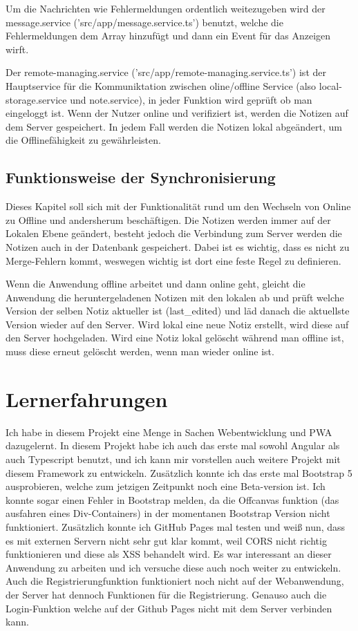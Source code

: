 \documentclass[12pt]{article}
\begin{document}
Um die Nachrichten wie Fehlermeldungen ordentlich weitezugeben wird der message.service ('src/app/message.service.ts') benutzt, welche die Fehlermeldungen dem Array hinzufügt und dann ein Event für das Anzeigen wirft.

Der remote-managing.service ('src/app/remote-managing.service.ts') ist der Hauptservice für die Kommuniktation zwischen oline/offline Service (also local-storage.service und note.service), in jeder Funktion wird geprüft ob man eingeloggt ist. Wenn der Nutzer online und verifiziert ist, werden die Notizen auf dem Server gespeichert. In jedem Fall werden die Notizen lokal abgeändert, um die Offlinefähigkeit zu gewährleisten. 

        \subsection{Funktionsweise der Synchronisierung}
        
Dieses Kapitel soll sich mit der Funktionalität rund um den Wechseln von Online zu Offline und andersherum beschäftigen. Die Notizen werden immer auf der Lokalen Ebene geändert, besteht jedoch die Verbindung zum Server werden die Notizen auch in der Datenbank gespeichert. Dabei ist es wichtig, dass es nicht zu Merge-Fehlern kommt, weswegen wichtig ist dort eine feste Regel zu definieren. 

Wenn die Anwendung offline arbeitet und dann online geht, gleicht die Anwendung die heruntergeladenen Notizen mit den lokalen ab und prüft welche Version der selben Notiz aktueller ist (last\_edited) und läd danach die aktuellste Version wieder auf den Server. Wird lokal eine neue Notiz erstellt, wird diese auf den Server hochgeladen. Wird eine Notiz lokal gelöscht während man offline ist, muss diese erneut gelöscht werden, wenn man wieder online ist. 
    
    \section{Lernerfahrungen}

Ich habe in diesem Projekt eine Menge in Sachen Webentwicklung und PWA dazugelernt. In diesem Projekt habe ich auch das erste mal sowohl Angular als auch Typescript benutzt, und ich kann mir vorstellen auch weitere Projekt mit diesem Framework zu entwickeln. Zusätzlich konnte ich das erste mal Bootstrap 5 ausprobieren, welche zum jetzigen Zeitpunkt noch eine Beta-version ist. Ich konnte sogar einen Fehler in Bootstrap melden, da die Offcanvas funktion (das ausfahren eines Div-Containers) in der momentanen Bootstrap Version nicht funktioniert.  Zusätzlich konnte ich GitHub Pages mal testen und weiß nun, dass es mit externen Servern nicht sehr gut klar kommt, weil CORS nicht richtig funktionieren und diese als XSS behandelt wird. Es war interessant an dieser Anwendung zu arbeiten und ich versuche diese auch noch weiter zu entwickeln. Auch die Registrierungfunktion funktioniert noch nicht auf der Webanwendung, der Server hat dennoch Funktionen für die Registrierung. Genauso auch die Login-Funktion welche auf der Github Pages nicht mit dem Server verbinden kann.
\end{document}
